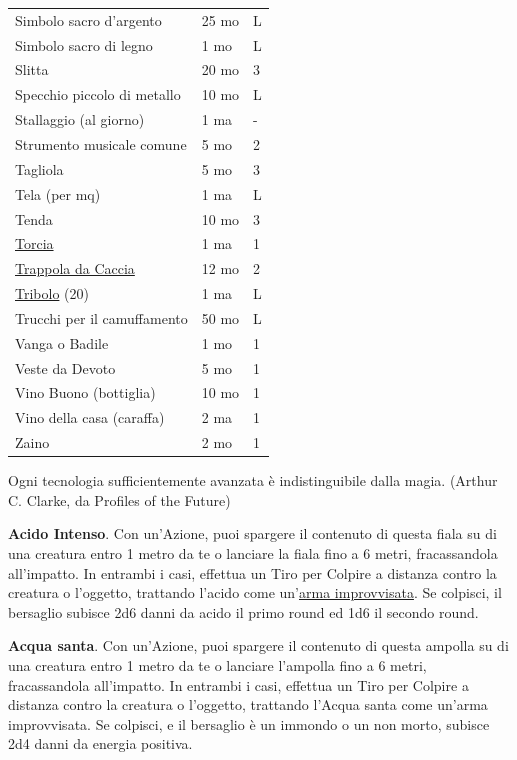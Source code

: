 \begin{multicols}{2}
\begin{tabular}{p{5.1cm}p{1.5cm}p{0.7cm}}
Simbolo sacro d'argento & 25 mo & L \\
Simbolo sacro di legno & 1 mo & L \\
Slitta & 20 mo & 3 \\
Specchio piccolo di metallo & 10 mo & L \\
Stallaggio (al giorno) & 1 ma & - \\
Strumento musicale comune & 5 mo & 2 \\
Tagliola & 5 mo & 3 \\
Tela (per mq) & 1 ma & L \\
Tenda & 10 mo & 3 \\
\hyperlink{Torcia}{Torcia} & 1 ma & 1 \\
\hyperlink{Trappola da Caccia}{Trappola da Caccia} & 12 mo & 2\\
\hyperlink{Tribolo}{Tribolo} (20) & 1 ma & L \\
Trucchi per il camuffamento & 50 mo & L \\
Vanga o Badile & 1 mo & 1 \\
Veste da Devoto & 5 mo & 1 \\
Vino Buono (bottiglia) & 10 mo & 1 \\
Vino della casa (caraffa) & 2 ma & 1 \\
Zaino & 2 mo & 1 \\
\end{tabular}

\medskip

\begin{enfasi}{
Ogni tecnologia sufficientemente avanzata è indistinguibile dalla magia. (Arthur C. Clarke, da Profiles of the Future)
}\end{enfasi}

\medskip

\textbf{Acido Intenso}\label{Acido Intenso}\hypertarget{Acido Intenso}{}. Con un'Azione, puoi spargere il contenuto di questa fiala su di una creatura entro 1 metro da te o lanciare la fiala fino a 6 metri, fracassandola all'impatto. In entrambi i casi, effettua un Tiro per Colpire a distanza contro la creatura o l'oggetto, trattando l'acido come un'\hyperlink{armaimprovvisata}{arma improvvisata}. Se colpisci, il bersaglio subisce 2d6 danni da acido il primo round ed 1d6 il secondo round.

\textbf{Acqua santa}\label{Acqua santa}\hypertarget{Acqua santa}{}. Con un'Azione, puoi spargere il contenuto di questa ampolla su di una creatura entro 1 metro da te o lanciare l'ampolla fino a 6 metri, fracassandola all'impatto. In entrambi i casi, effettua un Tiro per Colpire a distanza contro la creatura o l'oggetto, trattando l'Acqua santa come un'arma improvvisata. Se colpisci, e il bersaglio è un immondo o un non morto, subisce 2d4 danni da energia positiva.


\end{multicols}
